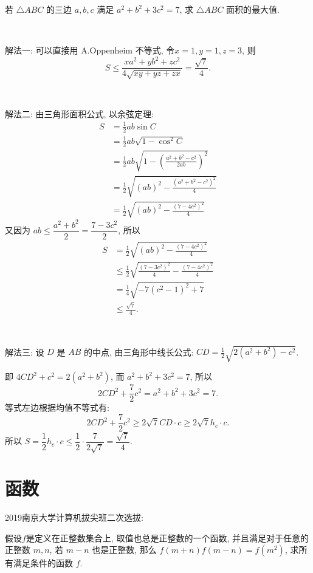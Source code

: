 \newpage
若 $\triangle ABC$ 的三边 $a,b,c$ 满足 $a^2+b^2+3c^2=7$, 求 $\triangle ABC$ 面积的最大值.

~

\noindent 解法一: 可以直接用 A.Oppenheim 不等式, 令$x=1,y=1,z=3$, 则
\[S\le\frac{xa^2+yb^2+zc^2}{4\sqrt{xy+yz+zx}} = \frac{\sqrt{7}}{4}. \]

~

\noindent 解法二: 由三角形面积公式, 以余弦定理:
\begin{align*}
S &= \frac{1}{2}ab\sin C \\
&= \frac{1}{2}ab\sqrt{1-\cos^2 C}\\
&= \frac{1}{2}ab\sqrt{1-\left(\frac{a^2+b^2-c^2}{2ab}\right)^2}\\
&= \frac{1}{2}\sqrt{(ab)^2-\frac{(a^2+b^2-c^2)^2}{4}}\\
&=\frac{1}{2}\sqrt{(ab)^2-\frac{(7-4c^2)^2}{4}}
\end{align*}
又因为 $ab\le\dfrac{a^2+b^2}{2}=\dfrac{7-3c^2}{2}$, 所以
\begin{align*}
S &=\frac{1}{2}\sqrt{(ab)^2-\frac{(7-4c^2)^2}{4}}\\
& \le\frac{1}{2}\sqrt{\frac{(7-3c^2)^2}{4}-\frac{(7-4c^2)^2}{4}}\\
&= \frac{1}{4}\sqrt{-7(c^2-1)^2+7}\\
&\le \frac{\sqrt{7}}{4}.
\end{align*}

~

\noindent 解法三: 设 $D$ 是 $AB$ 的中点, 由三角形中线长公式: $\displaystyle CD = \frac{1}{2}\sqrt{2(a^2+b^2)-c^2}$.

即 $4CD^2 + c^2 = 2(a^2+b^2)$, 而 $a^2+b^2+3c^2=7$, 所以
\[2CD^2+\frac{7}{2}c^2=a^2+b^2+3c^2=7.\]
等式左边根据均值不等式有: 
\[2CD^2+\frac{7}{2}c^2 \ge 2\sqrt{7}CD\cdot c\ge 2\sqrt{7}h_c\cdot c.\]
所以 $S=\dfrac{1}{2}h_c\cdot c \le \dfrac{1}{2}\cdot\dfrac{7}{2\sqrt{7}}=\dfrac{\sqrt{7}}{4}.$

\newpage
\section{函数}

\noindent 2019南京大学计算机拔尖班二次选拔:

假设$f$是定义在正整数集合上, 取值也总是正整数的一个函数, 并且满足对于任意的正整数 $m,n$, 若 $m-n$ 也是正整数, 那么 $f(m+n)f(m-n)=f(m^2)$, 求所有满足条件的函数 $f$.

